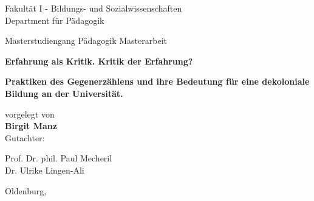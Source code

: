 \begin{titlepage}
 
 \begin{center}

  \begin{sffamily}
    Fakultät I - Bildungs- und Sozialwissenschaften \\[0.1em]
    Department für Pädagogik \\
  \end{sffamily}
  \vspace*{0.5cm}
  Masterstudiengang Pädagogik
  \vspace*{0.5cm}
  Masterarbeit

  \begin{sffamily}
    \huge \bfseries Erfahrung als Kritik. Kritik der Erfahrung?\\[0.75em]
  \end{sffamily}
 
  \begin{sffamily}
    \large \bfseries Praktiken des Gegenerzählens und ihre Bedeutung für eine
    dekoloniale Bildung an der Universität. \\[1em]
  \end{sffamily}

  vorgelegt von \\[0.75em]
  \large \textbf{Birgit Manz} \\[1em]
\vspace*{1cm}
Gutachter: \\[0.75em]
  \begin{bfseries}
Prof. Dr. phil. Paul Mecheril
    \\[0.2em]
Dr. Ulrike Lingen-Ali
 \end{bfseries}

  \vspace*{1.2cm}



  Oldenburg,
  \date{09.07.2017}

  \vfill


\end{center} 
\end{titlepage}


